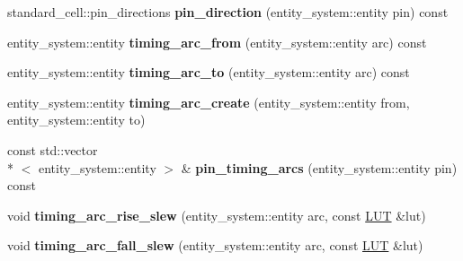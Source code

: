 \begin{DoxyCompactItemize}
\item 
\hypertarget{classophidian_1_1timing_1_1library_a4871ad8590451ccaea76efed59d5bc72}{standard\-\_\-cell\-::pin\-\_\-directions {\bfseries pin\-\_\-direction} (entity\-\_\-system\-::entity pin) const }\label{classophidian_1_1timing_1_1library_a4871ad8590451ccaea76efed59d5bc72}

\item 
\hypertarget{classophidian_1_1timing_1_1library_a591825f46c0b13be353d52f6c670b912}{entity\-\_\-system\-::entity {\bfseries timing\-\_\-arc\-\_\-from} (entity\-\_\-system\-::entity arc) const }\label{classophidian_1_1timing_1_1library_a591825f46c0b13be353d52f6c670b912}

\item 
\hypertarget{classophidian_1_1timing_1_1library_af95bd559310a9de74ca90ba84d6447fd}{entity\-\_\-system\-::entity {\bfseries timing\-\_\-arc\-\_\-to} (entity\-\_\-system\-::entity arc) const }\label{classophidian_1_1timing_1_1library_af95bd559310a9de74ca90ba84d6447fd}

\item 
\hypertarget{classophidian_1_1timing_1_1library_a7332cceb66064228017364f4b8127a15}{entity\-\_\-system\-::entity {\bfseries timing\-\_\-arc\-\_\-create} (entity\-\_\-system\-::entity from, entity\-\_\-system\-::entity to)}\label{classophidian_1_1timing_1_1library_a7332cceb66064228017364f4b8127a15}

\item 
\hypertarget{classophidian_1_1timing_1_1library_a397199965f74c10337bf2ac6084c1781}{const std\-::vector\\*
$<$ entity\-\_\-system\-::entity $>$ \& {\bfseries pin\-\_\-timing\-\_\-arcs} (entity\-\_\-system\-::entity pin) const }\label{classophidian_1_1timing_1_1library_a397199965f74c10337bf2ac6084c1781}

\item 
\hypertarget{classophidian_1_1timing_1_1library_a38b8088fc944d3aa953cab2e676a91fa}{void {\bfseries timing\-\_\-arc\-\_\-rise\-\_\-slew} (entity\-\_\-system\-::entity arc, const \hyperlink{classophidian_1_1timing_1_1lookup__table}{L\-U\-T} \&lut)}\label{classophidian_1_1timing_1_1library_a38b8088fc944d3aa953cab2e676a91fa}

\item 
\hypertarget{classophidian_1_1timing_1_1library_a8976ad28e0d4838d506bd0c11bf5ac8b}{void {\bfseries timing\-\_\-arc\-\_\-fall\-\_\-slew} (entity\-\_\-system\-::entity arc, const \hyperlink{classophidian_1_1timing_1_1lookup__table}{L\-U\-T} \&lut)}\label{classophidian_1_1timing_1_1library_a8976ad28e0d4838d506bd0c11bf5ac8b}


\end{DoxyCompactItemize}
